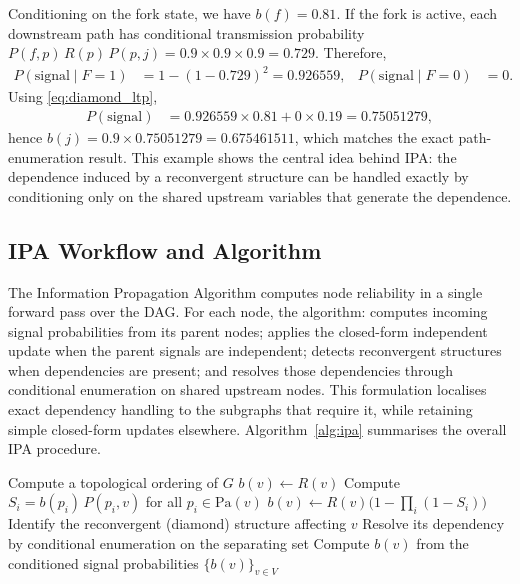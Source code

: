 \documentclass[preprint,12pt]{elsarticle}
\theoremstyle{definition}
\begin{document}
Conditioning on the fork state, we have $b(f)=0.81$. If the fork is active, each downstream path has
conditional transmission probability $P(f,p)\,R(p)\,P(p,j)=0.9\times0.9\times0.9=0.729$. Therefore,
\begin{align*}
P(\text{signal}\mid F=1)&=1-(1-0.729)^2=0.926559, &
P(\text{signal}\mid F=0)&=0 .
\end{align*}
Using \eqref{eq:diamond_ltp},
\begin{align*}
P(\text{signal})&=0.926559\times0.81+0\times0.19=0.75051279 ,
\end{align*}
hence $b(j)=0.9\times0.75051279=0.675461511$, which matches the exact path-enumeration result. This
example shows the central idea behind IPA: the dependence induced by a reconvergent structure can be
handled exactly by conditioning only on the shared upstream variables that generate the dependence.

\subsection{IPA Workflow and Algorithm}\label{sec:workflow}

The Information Propagation Algorithm computes node reliability in a single forward pass over the DAG.
For each node, the algorithm: computes incoming signal probabilities from its parent nodes; applies the
closed-form independent update when the parent signals are independent; detects reconvergent structures
when dependencies are present; and resolves those dependencies through conditional enumeration on shared
upstream nodes. This formulation localises exact dependency handling to the subgraphs that require it,
while retaining simple closed-form updates elsewhere. Algorithm~\ref{alg:ipa} summarises the overall IPA
procedure.

\begin{algorithm}[t]
\caption{Information Propagation Algorithm (IPA)}
\label{alg:ipa}
\begin{algorithmic}[1]
\State Compute a topological ordering of $G$
   $b(v)\gets R(v)$
  \Else
    \State Compute $S_i=b(p_i)\,P(p_i,v)$ for all $p_i\in\mathrm{Pa}(v)$
      \State $b(v)\gets R(v)\bigl(1-\prod_i(1-S_i)\bigr)$
    \Else
      \State Identify the reconvergent (diamond) structure affecting $v$
      \State Resolve its dependency by conditional enumeration on the separating set
      \State Compute $b(v)$ from the conditioned signal probabilities
    \EndIf
  \EndIf
\EndFor
\State \Return $\{b(v)\}_{v\in V}$
\end{algorithmic}
\end{algorithm}
\end{document}
